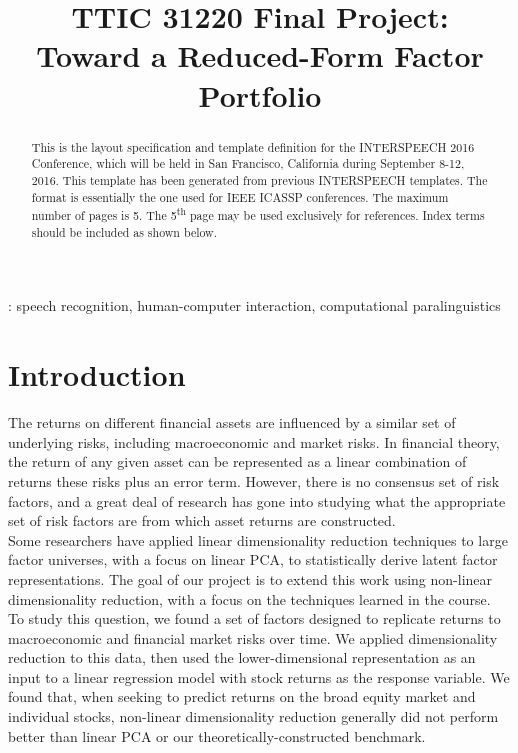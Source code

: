 \documentclass[a4paper]{article}
\title{TTIC 31220 Final Project: \\ Toward a Reduced-Form Factor Portfolio}
\begin{document}
  \maketitle
  \begin{abstract}
    This is the layout specification and template definition for the INTERSPEECH 2016 Conference, which will be held in San Francisco, California during September 8-12, 2016.
    This template has been generated from previous INTERSPEECH templates. 
    The format is essentially the one used for IEEE ICASSP conferences. 
    The maximum number of pages is 5. 
    The 5\textsuperscript{th} page may be used exclusively for references. 
    Index terms should be included as shown below.
  \end{abstract}
  : speech recognition, human-computer interaction, computational paralinguistics



  \section{Introduction}

    The returns on different financial assets are influenced by a similar set of underlying risks, including macroeconomic and market risks. In financial theory, the return of any given asset can be represented as a linear combination of returns these risks plus an error term. However, there is no consensus set of risk factors, and a great deal of research has gone into studying what the appropriate set of risk factors are from which asset returns are constructed. \\ Some researchers have applied linear dimensionality reduction techniques to large factor universes, with a focus on linear PCA, to statistically derive latent factor representations. The goal of our project is to extend this work using non-linear dimensionality reduction, with a focus on the techniques learned in the course. \\ To study this question, we found a set of factors designed to replicate returns to macroeconomic and financial market risks over time. We applied dimensionality reduction to this data, then used the lower-dimensional representation as an input to a linear regression model with stock returns as the response variable. We found that, when seeking to predict returns on the broad equity market and individual stocks, non-linear dimensionality reduction generally did not perform better than linear PCA or our theoretically-constructed benchmark.
\end{document}
